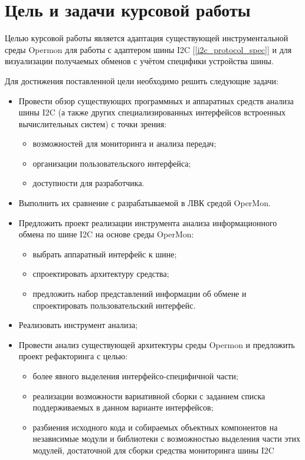 \section{Цель и задачи курсовой работы}

Целью курсовой работы является адаптация существующей инструментальной среды Opermon для работы с адаптером шины I2C [\ref{i2c_protocol_spec}] и для визуализации  получаемых обменов с учётом специфики устройства шины.

Для достижения поставленной цели необходимо решить следующие задачи:

\begin{itemize}
 \item Провести обзор существующих программных и аппаратных средств анализа шины I2C (а также других специализированных интерфейсов встроенных вычислительных систем) с точки зрения:
 
 \begin{itemize}
  \item возможностей для мониторинга и анализа передач;
  \item организации пользовательского интерфейса;
  \item доступности для разработчика.
 \end{itemize}
 
 \item Выполнить их сравнение с разрабатываемой в ЛВК средой OperMon.
 
 \item Предложить проект реализации инструмента анализа информационного обмена по шине I2C на основе среды OperMon:
 
 \begin{itemize}
  \item выбрать аппаратный интерфейс к шине;
  \item спроектировать архитектуру средства;
  \item предложить набор представлений информации об обмене и спроектировать пользовательский интерфейс.
 \end{itemize}

 
 \item Реализовать инструмент анализа;
 
 \item Провести анализ существующей архитектуры среды Opermon и предложить проект рефакторинга с целью:
 
 \begin{itemize}
  \item более явного выделения интерфейсо-специфичной части;
  \item реализации возможности вариативной сборки с заданием списка поддерживаемых в данном варианте интерфейсов;
  \item разбиения исходного кода и собираемых объектных компонентов на независимые модули и библиотеки с возможностью выделения части этих модулей, достаточной для сборки средства мониторинга шины I2C
 \end{itemize}
 
\end{itemize}
